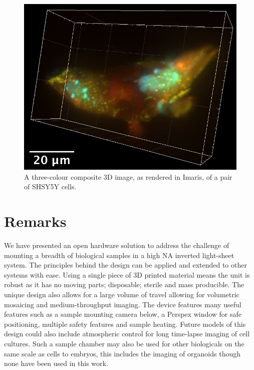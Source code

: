 \begin{figure}
    \centering
    \includegraphics[width=0.8\linewidth]{./cell_image}
    \caption{A three-colour composite 3D image, as rendered in Imaris, of a pair of SHSY5Y cells.}
    \label{}
\end{figure}


\section{Remarks}
We have presented an open hardware solution to address the challenge of mounting a breadth of biological samples in a high NA inverted light-sheet system.
The principles behind the design can be applied and extended to other systems with ease.
Using a single piece of 3D printed material means the unit is robust as it has no moving parts; disposable; sterile and mass producible.
The unique design also allows for a large volume of travel allowing for volumetric mosaicing and medium-throughput imaging.
The device features many useful features such as a sample mounting camera below, a Perspex window for safe positioning, multiple safety features and sample heating.
Future models of this design could also include atmospheric control for long time-lapse imaging of cell cultures. Such a sample chamber may also be used for other biologicals on the same scale as cells to embryos, this includes the imaging of organoids though none have been used in this work.



